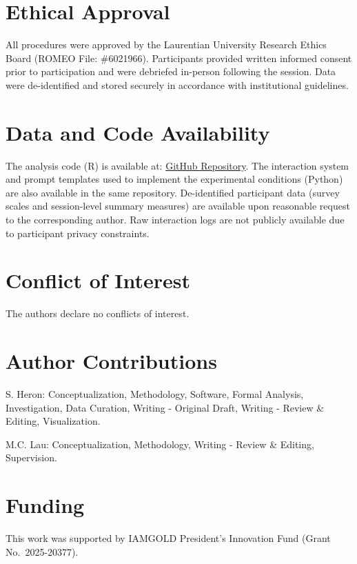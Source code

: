 \documentclass[
  authoryear,
  doubleblind,
  3p]{elsarticle}
\begin{document}
\section{Ethical Approval}\label{ethical-approval}

All procedures were approved by the Laurentian University Research
Ethics Board (ROMEO File: \#6021966). Participants provided written
informed consent prior to participation and were debriefed in-person
following the session. Data were de-identified and stored securely in
accordance with institutional guidelines.

\section{Data and Code Availability}\label{data-and-code-availability}

The analysis code (R) is available at:
\href{https://github.com/shaunaheron2/misty-paper}{GitHub Repository}.
The interaction system and prompt templates used to implement the
experimental conditions (Python) are also available in the same
repository. De-identified participant data (survey scales and
session-level summary measures) are available upon reasonable request to
the corresponding author. Raw interaction logs are not publicly
available due to participant privacy constraints.

\section{Conflict of Interest}\label{conflict-of-interest}

The authors declare no conflicts of interest.

\section{Author Contributions}\label{author-contributions}

S. Heron: Conceptualization, Methodology, Software, Formal Analysis,
Investigation, Data Curation, Writing - Original Draft, Writing - Review
\& Editing, Visualization.

M.C. Lau: Conceptualization, Methodology, Writing - Review \& Editing,
Supervision.

\section{Funding}\label{funding}

This work was supported by IAMGOLD President's Innovation Fund (Grant
No.~2025-20377).
\end{document}
